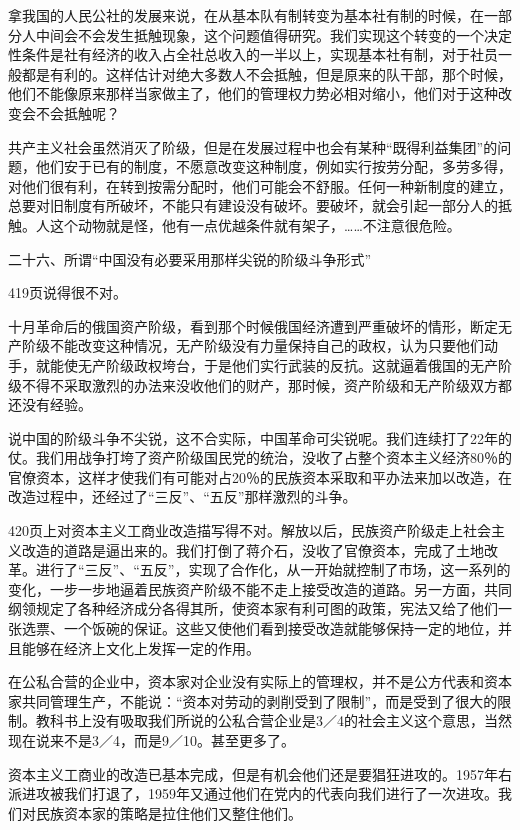 拿我国的人民公社的发展来说，在从基本队有制转变为基本社有制的时候，在一部分人中间会不会发生抵触现象，这个问题值得研究。我们实现这个转变的一个决定性条件是社有经济的收入占全社总收入的一半以上，实现基本社有制，对于社员一般都是有利的。这样估计对绝大多数人不会抵触，但是原来的队干部，那个时候，他们不能像原来那样当家做主了，他们的管理权力势必相对缩小，他们对于这种改变会不会抵触呢？

共产主义社会虽然消灭了阶级，但是在发展过程中也会有某种“既得利益集团”的问题，他们安于已有的制度，不愿意改变这种制度，例如实行按劳分配，多劳多得，对他们很有利，在转到按需分配时，他们可能会不舒服。任何一种新制度的建立，总要对旧制度有所破坏，不能只有建设没有破坏。要破坏，就会引起一部分人的抵触。人这个动物就是怪，他有一点优越条件就有架子，……不注意很危险。

二十六、所谓“中国没有必要采用那样尖锐的阶级斗争形式”

419页说得很不对。

十月革命后的俄国资产阶级，看到那个时候俄国经济遭到严重破坏的情形，断定无产阶级不能改变这种情况，无产阶级没有力量保持自己的政权，认为只要他们动手，就能使无产阶级政权垮台，于是他们实行武装的反抗。这就逼着俄国的无产阶级不得不采取激烈的办法来没收他们的财产，那时候，资产阶级和无产阶级双方都还没有经验。

说中国的阶级斗争不尖锐，这不合实际，中国革命可尖锐呢。我们连续打了22年的仗。我们用战争打垮了资产阶级国民党的统治，没收了占整个资本主义经济80％的官僚资本，这样才使我们有可能对占20％的民族资本采取和平办法来加以改造，在改造过程中，还经过了“三反”、“五反”那样激烈的斗争。

420页上对资本主义工商业改造描写得不对。解放以后，民族资产阶级走上社会主义改造的道路是逼出来的。我们打倒了蒋介石，没收了官僚资本，完成了土地改革。进行了“三反”、“五反”，实现了合作化，从一开始就控制了市场，这一系列的变化，一步一步地逼着民族资产阶级不能不走上接受改造的道路。另一方面，共同纲领规定了各种经济成分各得其所，使资本家有利可图的政策，宪法又给了他们一张选票、一个饭碗的保证。这些又使他们看到接受改造就能够保持一定的地位，并且能够在经济上文化上发挥一定的作用。

在公私合营的企业中，资本家对企业没有实际上的管理权，并不是公方代表和资本家共同管理生产，不能说：“资本对劳动的剥削受到了限制”，而是受到了很大的限制。教科书上没有吸取我们所说的公私合营企业是3／4的社会主义这个意思，当然现在说来不是3／4，而是9／10。甚至更多了。

资本主义工商业的改造已基本完成，但是有机会他们还是要猖狂进攻的。1957年右派进攻被我们打退了，1959年又通过他们在党内的代表向我们进行了一次进攻。我们对民族资本家的策略是拉住他们又整住他们。

